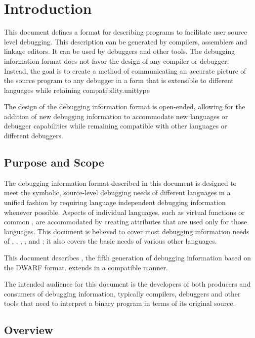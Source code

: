 \chapter{Introduction}
\label{chap:introduction}
This document defines a format for describing programs to
facilitate user source level debugging. This description
can be generated by compilers, assemblers and linkage
editors. It can be used by debuggers and other tools. 
The debugging information format does not favor the design of any
compiler or debugger. 
Instead, the goal is to create a method
of communicating an accurate picture of the source program
to any debugger in a form that is extensible to different
languages while retaining compatibility.unittype
  
The design of the
debugging information format is open-ended, allowing for
the addition of new debugging information to accommodate new
languages or debugger capabilities while remaining compatible
with other languages or different debuggers.

\section{Purpose and Scope}
The debugging information format described in this document is
designed to meet the symbolic, source-level debugging needs of
different languages in a unified fashion by requiring language
independent debugging information whenever possible.  
Aspects
of individual languages, such as  virtual functions or
 common 
, are accommodated by creating attributes
that are used only for those languages. 
This document is
believed to cover most debugging information needs of 
,
, , , 
and ; it also covers the basic needs
of various other languages.

This document describes \DWARFVersionV,
the fifth generation
of debugging information based on the DWARF format. 
\DWARFVersionV{} extends \DWARFVersionIV{}
in a compatible manner.

The intended audience for this document is the developers
of both producers and consumers of debugging information,
typically compilers, debuggers and other tools that need to
interpret a binary program in terms of its original source.


\section{Overview}

